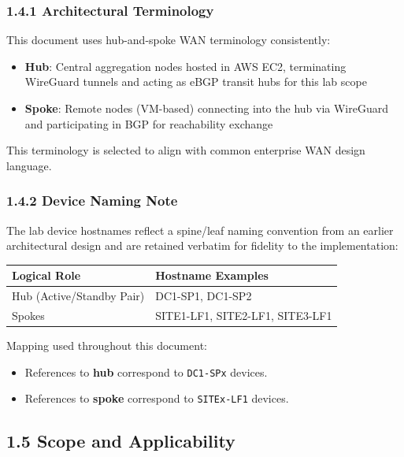 \documentclass[11pt]{article}
\begin{document}
\subsubsection{1.4.1 Architectural Terminology}
\label{sec:architectural-terminology}

This document uses hub-and-spoke WAN terminology consistently:

\begin{itemize}
  \item \textbf{Hub}: Central aggregation nodes hosted in AWS EC2, terminating WireGuard tunnels and acting as eBGP transit hubs for this lab scope
  \item \textbf{Spoke}: Remote nodes (VM-based) connecting into the hub via WireGuard and participating in BGP for reachability exchange
\end{itemize}

This terminology is selected to align with common enterprise WAN design language.

\subsubsection{1.4.2 Device Naming Note}
\label{sec:device-naming}

The lab device hostnames reflect a spine/leaf naming convention from an earlier architectural design and are retained verbatim for fidelity to the implementation:

\begin{tabular}{|l|l|}
\hline
\textbf{Logical Role} & \textbf{Hostname Examples} \\
\hline
Hub (Active/Standby Pair) & DC1-SP1, DC1-SP2 \\
\hline
Spokes & SITE1-LF1, SITE2-LF1, SITE3-LF1 \\
\hline
\end{tabular}

Mapping used throughout this document:

\begin{itemize}
  \item References to \textbf{hub} correspond to \texttt{DC1-SPx} devices.
  \item References to \textbf{spoke} correspond to \texttt{SITEx-LF1} devices.
\end{itemize}

\subsection{1.5 Scope and Applicability}
\label{sec:scope}
\end{document}
